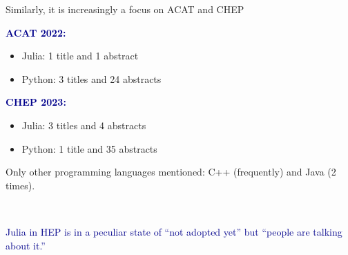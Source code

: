 \documentclass[aspectratio=169]{beamer}
\begin{document}

\begin{frame}{Similarly, it is increasingly a focus on ACAT and CHEP}
\vspace{0.5 cm}

\textcolor{darkblue}{\Large\bf ACAT 2022:}
\begin{itemize}
\item Julia: 1 title and 1 abstract
\item Python: 3 titles and 24 abstracts
\end{itemize}

\vspace{0.5 cm}
\textcolor{darkblue}{\Large\bf CHEP 2023:}
\begin{itemize}
\item Julia: 3 titles and 4 abstracts
\item Python: 1 title and 35 abstracts
\end{itemize}

\vspace{0.5 cm}
Only other programming languages mentioned: C++ (frequently) and Java (2 times).
\end{frame}

\begin{frame}{\mbox{ }}
\vspace{0.5 cm}
\LARGE
\begin{center}
\textcolor{darkblue}{Julia in HEP is in a peculiar state of ``not adopted yet'' but ``people are talking about it.''}
\end{center}
\end{frame}

\begin{frame}{}

\end{frame}
\end{document}
